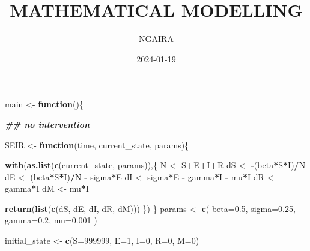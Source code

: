 \documentclass[
]{article}
\title{MATHEMATICAL MODELLING}
\author{NGAIRA}
\date{2024-01-19}
\newenvironment{Shaded}{\begin{snugshade}}{\end{snugshade}}
\newcommand{\AttributeTok}[1]{\textcolor[rgb]{0.13,0.29,0.53}{#1}}
\newcommand{\ControlFlowTok}[1]{\textcolor[rgb]{0.13,0.29,0.53}{\textbf{#1}}}
\newcommand{\DecValTok}[1]{\textcolor[rgb]{0.00,0.00,0.81}{#1}}
\newcommand{\DocumentationTok}[1]{\textcolor[rgb]{0.56,0.35,0.01}{\textbf{\textit{#1}}}}
\newcommand{\FloatTok}[1]{\textcolor[rgb]{0.00,0.00,0.81}{#1}}
\newcommand{\FunctionTok}[1]{\textcolor[rgb]{0.13,0.29,0.53}{\textbf{#1}}}
\newcommand{\NormalTok}[1]{#1}
\newcommand{\OtherTok}[1]{\textcolor[rgb]{0.56,0.35,0.01}{#1}}
\newcommand{\SpecialCharTok}[1]{\textcolor[rgb]{0.81,0.36,0.00}{\textbf{#1}}}
\begin{document}
\maketitle

\begin{Shaded}
\begin{Highlighting}[]
\NormalTok{main }\OtherTok{\textless{}{-}} \ControlFlowTok{function}\NormalTok{()\{}
  
  \DocumentationTok{\#\# no intervention}
  
\NormalTok{  SEIR }\OtherTok{\textless{}{-}} \ControlFlowTok{function}\NormalTok{(time, current\_state, params)\{}
    
    \FunctionTok{with}\NormalTok{(}\FunctionTok{as.list}\NormalTok{(}\FunctionTok{c}\NormalTok{(current\_state, params)),\{}
\NormalTok{      N }\OtherTok{\textless{}{-}}\NormalTok{ S}\SpecialCharTok{+}\NormalTok{E}\SpecialCharTok{+}\NormalTok{I}\SpecialCharTok{+}\NormalTok{R}
\NormalTok{      dS }\OtherTok{\textless{}{-}} \SpecialCharTok{{-}}\NormalTok{(beta}\SpecialCharTok{*}\NormalTok{S}\SpecialCharTok{*}\NormalTok{I)}\SpecialCharTok{/}\NormalTok{N}
\NormalTok{      dE }\OtherTok{\textless{}{-}}\NormalTok{ (beta}\SpecialCharTok{*}\NormalTok{S}\SpecialCharTok{*}\NormalTok{I)}\SpecialCharTok{/}\NormalTok{N }\SpecialCharTok{{-}}\NormalTok{ sigma}\SpecialCharTok{*}\NormalTok{E}
\NormalTok{      dI }\OtherTok{\textless{}{-}}\NormalTok{ sigma}\SpecialCharTok{*}\NormalTok{E }\SpecialCharTok{{-}}\NormalTok{ gamma}\SpecialCharTok{*}\NormalTok{I }\SpecialCharTok{{-}}\NormalTok{ mu}\SpecialCharTok{*}\NormalTok{I}
\NormalTok{      dR }\OtherTok{\textless{}{-}}\NormalTok{ gamma}\SpecialCharTok{*}\NormalTok{I}
\NormalTok{      dM }\OtherTok{\textless{}{-}}\NormalTok{ mu}\SpecialCharTok{*}\NormalTok{I}
      
      \FunctionTok{return}\NormalTok{(}\FunctionTok{list}\NormalTok{(}\FunctionTok{c}\NormalTok{(dS, dE, dI, dR, dM)))}
\NormalTok{    \})}
\NormalTok{  \}}
\NormalTok{  params }\OtherTok{\textless{}{-}} \FunctionTok{c}\NormalTok{(}
    \AttributeTok{beta=}\FloatTok{0.5}\NormalTok{, }
    \AttributeTok{sigma=}\FloatTok{0.25}\NormalTok{, }
    \AttributeTok{gamma=}\FloatTok{0.2}\NormalTok{, }
    \AttributeTok{mu=}\FloatTok{0.001}
\NormalTok{    )}
  
\NormalTok{  initial\_state }\OtherTok{\textless{}{-}} \FunctionTok{c}\NormalTok{(}\AttributeTok{S=}\DecValTok{999999}\NormalTok{, }\AttributeTok{E=}\DecValTok{1}\NormalTok{, }\AttributeTok{I=}\DecValTok{0}\NormalTok{, }\AttributeTok{R=}\DecValTok{0}\NormalTok{, }\AttributeTok{M=}\DecValTok{0}\NormalTok{)}
  

\end{Highlighting}
\end{Shaded}
\end{document}
